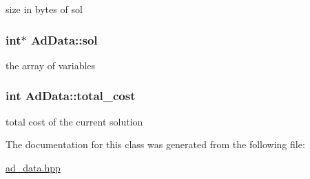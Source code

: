 size in bytes of sol \hypertarget{classAdData_a0b104c9abf7d64d2bbeb330dd237fd92}{
\subsubsection[{sol}]{\setlength{\rightskip}{0pt plus 5cm}int$\ast$ {\bf \-Ad\-Data\-::sol}}}\label{classAdData_a0b104c9abf7d64d2bbeb330dd237fd92}
the array of variables \hypertarget{classAdData_aac016a9f725d10bdcc414d089a493b6e}{
\subsubsection[{total\-\_\-cost}]{\setlength{\rightskip}{0pt plus 5cm}int {\bf \-Ad\-Data\-::total\-\_\-cost}}}\label{classAdData_aac016a9f725d10bdcc414d089a493b6e}
total cost of the current solution 

\-The documentation for this class was generated from the following file\-:\begin{DoxyCompactItemize}
\item 
\hyperlink{ad__data_8hpp}{ad\-\_\-data.\-hpp}\end{DoxyCompactItemize}
